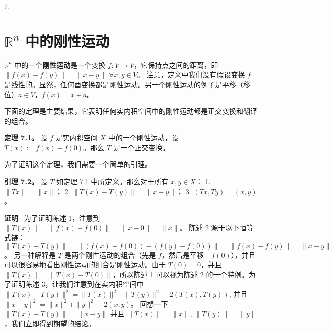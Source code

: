 7. 
\section{$\mathbb{R}^n$ 中的刚性运动}

$\mathbb{R}^n$ 中的一个\textbf{刚性运动}是一个变换 $f: V \to V$，它保持点之间的距离，即 $\|f(x) - f(y)\| = \|x - y\|$ $\forall x, y \in V$。
注意，定义中我们没有假设变换 $f$ 是线性的。显然，任何酉变换都是刚性运动。另一个刚性运动的例子是平移（移位）$a \in V$，$f(x) = x + a$。




下面的定理是主要结果，它表明任何实内积空间中的刚性运动都是正交变换和翻译的组合。

\textbf{定理 7.1。} 设 $f$ 是实内积空间 $X$ 中的一个刚性运动，设 $T(x) := f(x) - f(0)$。那么 $T$ 是一个正交变换。

为了证明这个定理，我们需要一个简单的引理。

\textbf{引理 7.2。} 设 $T$ 如定理 7.1 中所定义。那么对于所有 $x, y \in X$：
1. $\|Tx\| = \|x\|$；
2. $\|T(x) - T(y)\| = \|x - y\|$；
3. $(Tx, Ty) = (x, y)$。

\textbf{证明}~ 为了证明陈述 1，注意到 $\|T(x)\| = \|f(x) - f(0)\| = \|x - 0\| = \|x\|$。
陈述 2 源于以下恒等式链：$\|T(x) - T(y)\| = \|(f(x) - f(0)) - (f(y) - f(0))\| = \|f(x) - f(y)\| = \|x - y\|$。
另一种解释是 $T$ 是两个刚性运动的组合（先是 $f$，然后是平移 $-f(0)$），并且可以很容易地看出刚性运动的组合是刚性运动。由于 $T(0) = 0$，并且 $\|T(x)\| = \|T(x) - T(0)\|$，所以陈述 1 可以视为陈述 2 的一个特例。为了证明陈述 3，让我们注意到在实内积空间中
$\|T(x) - T(y)\|^2 = \|T(x)\|^2 + \|T(y)\|^2 - 2(T(x), T(y))$,
并且 $\|x - y\|^2 = \|x\|^2 + \|y\|^2 - 2(x, y)$。
回想一下 $\|T(x) - T(y)\| = \|x - y\|$ 并且 $\|T(x)\| = \|x\|$, $\|T(y)\| = \|y\|$，我们立即得到期望的结论。

